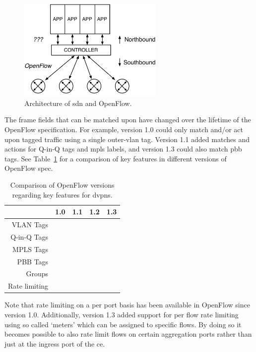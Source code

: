 \begin{figure}[!h]
	\centering
	\includegraphics[width=7cm]{./includes/of-arch.pdf}
	\caption{Architecture of \ac{sdn} and OpenFlow.}
	\label{fig:of-arch}
\end{figure}

The frame fields that can be matched upon have changed over the lifetime of the OpenFlow specification. For example, version 1.0 could only match and/or act upon tagged traffic using a single outer-\acs{vlan} tag. Version 1.1 added matches and actions for Q-in-Q tags and \ac{mpls} labels, and version 1.3 could also match \ac{pbb} tags. See Table~\ref{tb:of-versions} for a comparison of key features in different versions of OpenFlow spec. 

\begin{table}[!h]
	\centering
	\begin{tabular}{r|cccc}
	 			& 1.0 & 1.1 & 1.2 & 1.3 \\
	\hline
	VLAN Tags 	& \checkmark & \checkmark & \checkmark & \checkmark \\
	Q-in-Q Tags &   & \checkmark & \checkmark & \checkmark \\
	MPLS Tags 	&   & \checkmark & \checkmark & \checkmark \\
	PBB Tags 	&   &   &   & \checkmark \\
	Groups 		&   & \checkmark & \checkmark & \checkmark \\
	Rate limiting & \checkmark & \checkmark & \checkmark & \checkmark  \\
	\end{tabular}
	\caption{Comparison of OpenFlow versions regarding key features for \acp{dvpn}.}
	\label{tb:of-versions}	
\end{table}

Note that rate limiting on a per port basis has been available in OpenFlow since version 1.0. Additionally, version 1.3 added support for per flow rate limiting using so called `meters' which can be assigned to specific flows. By doing so it becomes possible to also rate limit flows on certain aggregation ports rather than just at the ingress port of the \ac{ce}.

